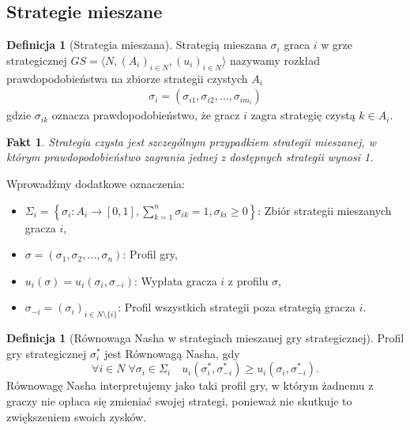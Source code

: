 \documentclass[inzynierska]{pwr_wmat_praca_dyplomowa}
\theoremstyle{plain}
\numberwithin{theorem}{chapter}
\newtheorem{fact}[theorem]{Fakt}
\theoremstyle{definition}
\numberwithin{theorem}{chapter}
\newtheorem{definition}[theorem]{Definicja}
\begin{document}
	\subsection{Strategie mieszane}
	\begin{definition}[Strategia mieszana]
		Strategią mieszana $\sigma_i$ graca $i$ w grze strategicznej $GS = \langle N, (A_i)_{i \in N}, (u_i)_{i \in N} \rangle $ nazywamy rozkład prawdopodobieństwa na zbiorze strategii czystych $A_i$
		\begin{align*}
			\sigma_i = (\sigma_{i1},  \sigma_{i2}, \dots, \sigma_{im_i})
		\end{align*}
	gdzie $\sigma_{ik}$ oznacza prawdopodobieństwo, że gracz $i$ zagra strategię czystą $k\in A_i$.  
	\end{definition}

	\begin{fact}
		Strategia czysta jest szczególnym przypadkiem strategii mieszanej, w którym prawdopodobieństwo zagrania jednej z dostępnych strategii wynosi 1.
	\end{fact}
	Wprowadźmy dodatkowe oznaczenia:
 	\begin{itemize}
 		\item $\Sigma_i  = \left\{ \sigma_i: A_i \rightarrow [0, 1], \sum_{k=1}^{n} \sigma_{ik} = 1,  \sigma_{ki}\ge 0 \right\}$: Zbiór strategii mieszanych gracza $i$,
 		\item  $\sigma = (\sigma_1, \sigma_2, \dots, \sigma_n)$: Profil gry,
 		\item $u_i(\sigma) = u_i(\sigma_i, \sigma_{-i})$: Wypłata gracza $i$ z profilu $\sigma$,
 		\item $\sigma_{-i} = (\sigma_i)_{i\in N \setminus \{i\}}$: Profil wszystkich strategii poza strategią gracza $i$. 
 	\end{itemize}
	\begin{definition}[Równowaga Nasha w strategiach mieszanej gry strategicznej]
		Profil gry strategicznej $\sigma_i^*$ jest Równowagą Nasha, gdy
		\begin{equation*}
			\mathop{\forall}{i \in N}\;
			\mathop{\forall}{\sigma_i \in \Sigma_i} \quad
			u_i(\sigma_i^*, \sigma_{-i}^*) \ge u_i(\sigma_i,  \sigma_{-i}^*).
		\end{equation*}
	Równowagę Nasha interpretujemy jako taki profil gry, w którym żadnemu z graczy nie opłaca się zmieniać swojej strategi, ponieważ nie skutkuje to zwiększeniem swoich zysków.
	\end{definition}
\end{document}
